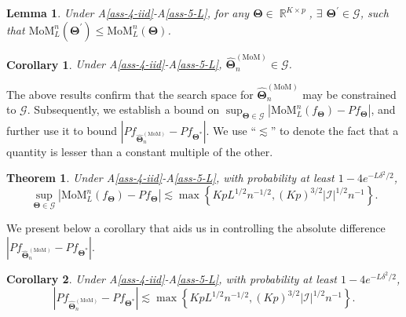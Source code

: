 \documentclass[11pt]{article}
\def\Real{\mathop{\mathbb{R}}\nolimits}
\newcommand{\bTheta}{\boldsymbol{\Theta}}
\newcommand{\I}{\mathcal{I}}
\newcommand{\cO}{\mathcal{O}}
\newcommand{\tm}{\widehat{\bTheta}_n^{(\text{MoM})}}
\newtheorem{thm}{Theorem}[section]
\newtheorem{lemma}{Lemma}[section]
\newtheorem{cor}{Corollary}[section]
\begin{document}
\begin{lemma}\label{lemma-6-spmom}
Under A\ref{ass-4-iid}-A\ref{ass-5-L}, for any $\bTheta \in \Real^{K\times p}$, $\exists$ $\bTheta^\prime \in \mathscr{G}$, such that $\text{MoM}_L^n(\bTheta^\prime) \le \text{MoM}_L^n(\bTheta)$.
\end{lemma}

\begin{cor}
Under A\ref{ass-4-iid}-A\ref{ass-5-L}, $\tm \in \mathscr{G}$.
\end{cor}

The above results confirm that the search space for $\tm$ may be constrained to $\mathscr{G}$. Subsequently, we establish a bound on $\sup_{\bTheta \in \mathscr{G}} |\text{MoM}^n_L (f_{\bTheta}) - Pf_{\bTheta} |$, and further use it to bound $|P f_{\tm} - P f_{\bTheta^\ast}|$. 
We %
use ``$\lesssim$'' to denote the fact that a quantity is lesser than a constant multiple of the other. %


\begin{thm}\label{thm-4-MoM}
Under A\ref{ass-4-iid}-A\ref{ass-5-L}, with probability at least $1-4e^{-L \delta^2/2}$, 
\[ \sup_{\bTheta \in \mathscr{G}} \left|\text{MoM}^n_L (f_{\bTheta}) - Pf_{\bTheta} \right| \lesssim  \max\left\{ Kp
L^{1/2}n^{-1/2}, (Kp)^{3/2}  |\I|^{1/2}n^{-1}\right\}.\]
\end{thm}

We present below a corollary that aids us in controlling the absolute difference $|P f_{\tm} - P f_{\bTheta^\ast}|$.

\begin{cor}
Under A\ref{ass-4-iid}-A\ref{ass-5-L}, with  probability at least $1-4e^{-L \delta^2/2}$,
\[ \left|P f_{\tm} - P f_{\bTheta^\ast}\right| \lesssim \max\left\{ KpL^{1/2}n^{-1/2}, (Kp)^{3/2} |\I|^{1/2}n^{-1}\right\}.\]
\end{cor}
\end{document}
